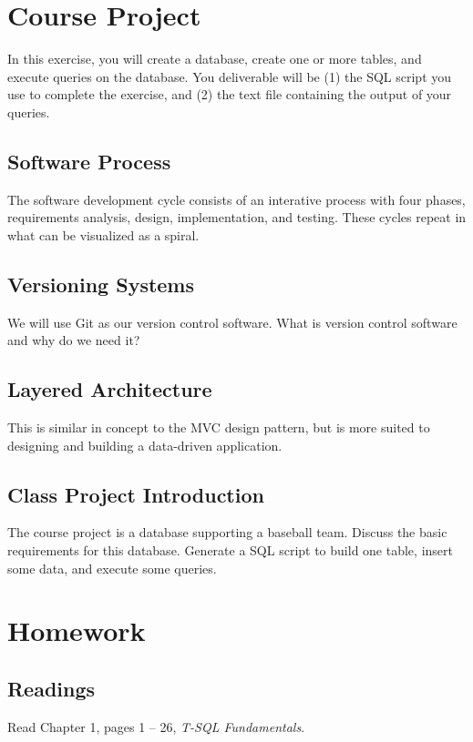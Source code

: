 \documentclass{article}
\begin{document}
    \section{Course Project}

    In this exercise, you will create a database, create one or more tables, and execute queries on the database. You deliverable will be (1) the SQL script you use to complete the exercise, and (2) the text file containing the output of your queries. 


    \subsection{Software Process}
The software development cycle consists of an interative process with four phases, requirements analysis, design, implementation, and testing. These cycles repeat in what can be visualized as a spiral.

    \subsection{Versioning Systems}
We will use Git as our version control software. What is version control software and why do we need it?

    \subsection{Layered Architecture}
    This is similar in concept to the MVC design pattern, but is more suited to designing and building a data-driven application.

    \subsection{Class Project Introduction}
    The course project is a database supporting a baseball team. Discuss the basic requirements for this database. Generate a SQL script to build one table, insert some data, and execute some queries.

    \section{Homework}

    \subsection{Readings}

    Read Chapter 1, pages 1 -- 26, \textit{T-SQL Fundamentals}.
\end{document}

